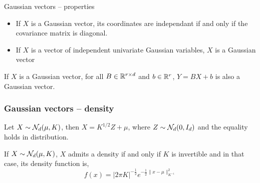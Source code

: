 \documentclass[10pt]{beamer}
\begin{document}
  \begin{frame}{Gaussian vectors -- properties}

    \begin{corollary}
      \begin{itemize}
      \item If $X$ is a Gaussian vector, its coordinates are independant if and only if
        the covariance matrix is diagonal.

        \pause

      \item If $X$ is a vector of independent univariate
        Gaussian variables, $X$ is a Gaussian vector

      \end{itemize}
    \end{corollary}

    \pause

    \begin{proposition}
      If $X$ is a Gaussian vector, for all $B \in \mathbb{R}^{r \times d}$ and $b
      \in \mathbb{R}^r$, $Y = BX + b$ is also a Gaussian vector.
    \end{proposition}
  \end{frame}

  \begin{frame}
    \frametitle{Gaussian vectors -- density}

    \begin{corollary}
      Let $X \sim \mathcal{N}_d(\mu,K)$, then $X =
      K^{1/2}Z + \mu$, where $Z \sim \mathcal{N}_d(0,I_d)$ and the equality holds in
      distribution. 
    \end{corollary}

    \pause

    \begin{corollary}
      
      If $X \sim \mathcal{N}_d(\mu,K)$, $X$ admits a density if and only if $K$ is
      invertible and in that case, its density function is,
      $$f(x)=|2 \pi K|^{-\frac{1}{2}} e^{-\frac{1}{2}\|x - \mu\|_{K^{-1}}^{2}}$$
    \end{corollary}
  \end{frame}
\end{document}
